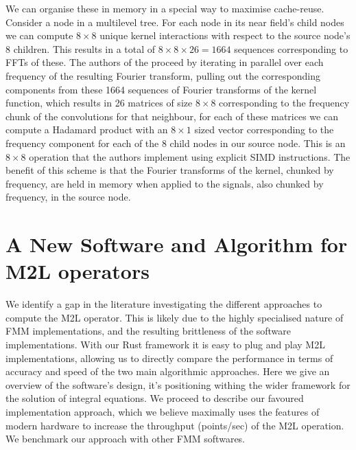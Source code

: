 \documentclass[12pt, a4, twoside]{article}
\begin{document}
We can organise these in memory in a special way to maximise cache-reuse. Consider a node in a multilevel tree. For each node in its near field's child nodes we can compute $8 \times 8$ unique kernel interactions with respect to the source node's 8 children. This results in a total of $8 \times 8 \times 26 = 1664$ sequences corresponding to FFTs of these. The authors of the \cite{Malhotra2015} proceed by iterating in parallel over each frequency of the resulting Fourier transform, pulling out the corresponding components from these 1664 sequences of Fourier transforms of the kernel function, which results in 26 matrices of size $8 \times 8$ corresponding to the frequency chunk of the convolutions for that neighbour, for each of these matrices we can compute a Hadamard product with an $8 \times 1$ sized vector corresponding to the frequency component for each of the 8 child nodes in our source node. This is an $8 \times 8$ operation that the authors implement using explicit SIMD instructions. The benefit of this scheme is that the Fourier transforms of the kernel, chunked by frequency, are held in memory when applied to the signals, also chunked by frequency, in the source node.


                


\section{A New Software and Algorithm for M2L operators}

We identify a gap in the literature investigating the different approaches to compute the M2L operator. This is likely due to the highly specialised nature of FMM implementations, and the resulting brittleness of the software implementations. With our Rust framework it is easy to plug and play M2L implementations, allowing us to directly compare the performance in terms of accuracy and speed of the two main algorithmic approaches. Here we give an overview of the software's design, it's positioning withing the wider framework for the solution of integral equations. We proceed to describe our favoured implementation approach, which we believe maximally uses the features of modern hardware to increase the throughput (points/sec) of the M2L operation. We benchmark our approach with other FMM softwares.
\end{document}
